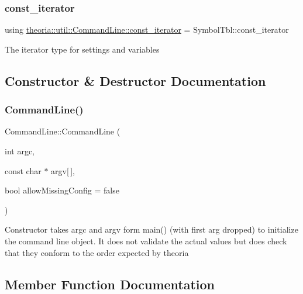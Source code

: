 \subsubsection{\texorpdfstring{const\+\_\+iterator}{const\_iterator}}
{\footnotesize\ttfamily using \hyperlink{classtheoria_1_1util_1_1CommandLine_a729aa00feedd8257d4caafc73ac6ee63}{theoria\+::util\+::\+Command\+Line\+::const\+\_\+iterator} =  Symbol\+Tbl\+::const\+\_\+iterator}

The iterator type for settings and variables 

\subsection{Constructor \& Destructor Documentation}
\mbox{\label{classtheoria_1_1util_1_1CommandLine_a7e753aa91c5a0018a1bec3439839852d}} 
\subsubsection{\texorpdfstring{Command\+Line()}{CommandLine()}}
{\footnotesize\ttfamily Command\+Line\+::\+Command\+Line (\begin{DoxyParamCaption}\item[{int}]{argc,  }\item[{const char $\ast$}]{argv\mbox{[}$\,$\mbox{]},  }\item[{bool}]{allow\+Missing\+Config = {\ttfamily false} }\end{DoxyParamCaption})}

Constructor takes argc and argv form main() (with first arg dropped) to initialize the command line object. It does not validate the actual values but does check that they conform to the order expected by theoria 

\subsection{Member Function Documentation}
\mbox{\label{classtheoria_1_1util_1_1CommandLine_ae0758c3259074eddfc06c4a77ac3a1a9}} 
